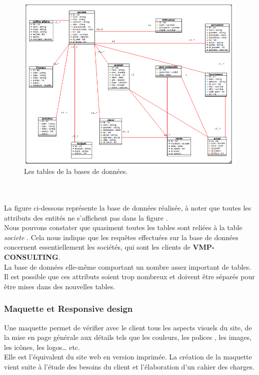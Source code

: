 \documentclass[12pt]{article}
\begin{document}
\\ \\

\begin{center}
\begin{figure}[htp]
  \centering
  \includegraphics[width=12cm]{bd1.png}
  \caption{Les tables de la bases de données.}
  \label{fig:une-autre-image}
\end{figure}

\end{center}
\\ \\

La figure ci-dessous représente la base de données réalisée, à noter que toutes les attributs des entités  ne s'affichent pas dans la figure .\\ Nous pouvons constater que quasiment toutes les tables sont reliées à la table  \textit{societe}  . Cela nous indique que les requêtes effectuées sur la base de données concernent essentiellement les sociétés, qui sont les clients de \textbf{VMP-CONSULTING}.\\
La base de données elle-même comportant un nombre assez important de tables.\\
 Il est possible que
ces attributs soient trop nombreux et doivent être séparés pour être mises dans des nouvelles
tables.\\



\subsubsection{Maquette et Responsive design}

Une maquette permet de vérifier avec le client tous les aspects visuels du site, de la mise en page générale aux détails tels que les couleurs, les polices , les images, les icônes, les logos… etc.\\
Elle est l’équivalent du site web en version imprimée. La création de la maquette vient suite à l’étude des besoins du client et l’élaboration d’un cahier des charges.\\
\end{document}
